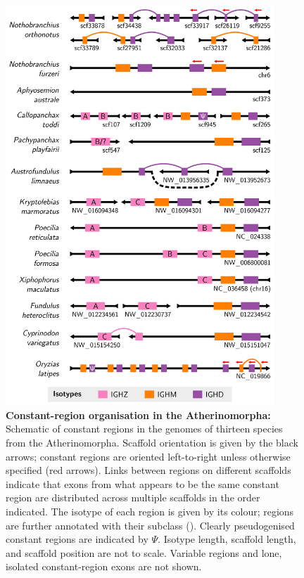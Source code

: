 \begin{figure}
\centering
\includegraphics[width=0.9\textwidth]{_Figures/png_edited/multispecies-ch-regions}
\caption[Constant-region organisation in the Atherinomorpha]{\textbf{Constant-region organisation in the Atherinomorpha:}
Schematic of \igh{} constant regions in the genomes of thirteen species from the Atherinomorpha. Scaffold orientation is given by the black arrows; constant regions are oriented left-to-right unless otherwise specified (red arrows). Links between regions on different scaffolds indicate that exons from what appears to be the same constant region are distributed across multiple scaffolds in the order indicated. The isotype of each region is given by its colour;  regions are further annotated with their subclass (). Clearly pseudogenised constant regions are indicated by $\Psi$. Isotype length, scaffold length, and scaffold position are not to scale. Variable regions and lone, isolated constant-region exons are not shown.}
\label{fig:multispecies-ch-regions}
\end{figure}

